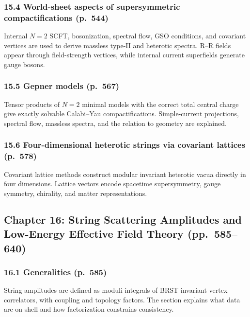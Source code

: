 \documentclass[
  10pt,
  a4paper,
  openany]{book}
\begin{document}
\subsubsection{15.4 World-sheet aspects of supersymmetric
compactifications
(p.~544)}\label{world-sheet-aspects-of-supersymmetric-compactifications-p.-544}

Internal \(N=2\) SCFT, bosonization, spectral flow, GSO conditions, and
covariant vertices are used to derive massless type-II and heterotic
spectra. R--R fields appear through field-strength vertices, while
internal current superfields generate gauge bosons.

\subsubsection{15.5 Gepner models (p.~567)}\label{gepner-models-p.-567}

Tensor products of \(N=2\) minimal models with the correct total central
charge give exactly solvable Calabi--Yau compactifications.
Simple-current projections, spectral flow, massless spectra, and the
relation to geometry are explained.

\subsubsection{15.6 Four-dimensional heterotic strings via covariant
lattices
(p.~578)}\label{four-dimensional-heterotic-strings-via-covariant-lattices-p.-578}

Covariant lattice methods construct modular invariant heterotic vacua
directly in four dimensions. Lattice vectors encode spacetime
supersymmetry, gauge symmetry, chirality, and matter representations.

\subsection{Chapter 16: String Scattering Amplitudes and Low-Energy
Effective Field Theory
(pp.~585--640)}\label{chapter-16-string-scattering-amplitudes-and-low-energy-effective-field-theory-pp.-585640}

\subsubsection{16.1 Generalities (p.~585)}\label{generalities-p.-585}

String amplitudes are defined as moduli integrals of BRST-invariant
vertex correlators, with coupling and topology factors. The section
explains what data are on shell and how factorization constrains
consistency.
\end{document}
